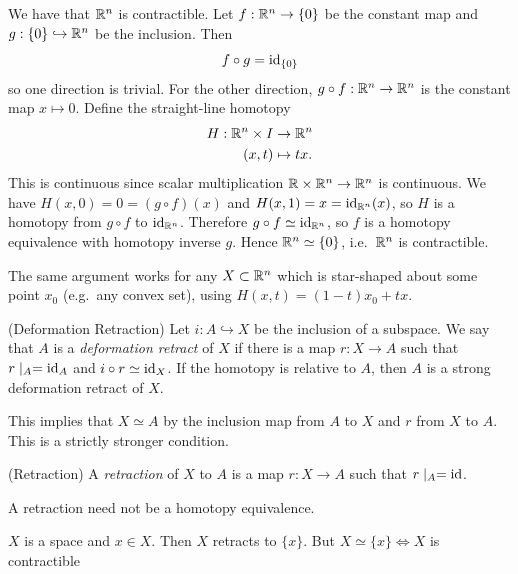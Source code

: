 \documentclass{article}
\begin{document}
\begin{example}
  We have that $ \mathbb{R}^n $ is contractible. Let $ f:\mathbb{R}^n\to\{0\} $ be the constant map and $ g:\{0\}\hookrightarrow\mathbb{R}^n $ be the inclusion. Then
  \[
	  f\circ g = \mathrm{id}_{\{0\}}
  \]
  so one direction is trivial. For the other direction, $ g\circ f:\mathbb{R}^n\to\mathbb{R}^n $ is the constant map $ x\mapsto 0 $. Define the straight-line homotopy
  \begin{align*}
	  H : \mathbb{R}^n \times I &\to \mathbb{R}^n\\
	  (x,t) &\mapsto tx.
  \end{align*}
  This is continuous since scalar multiplication $ \mathbb{R}\times\mathbb{R}^n\to\mathbb{R}^n $ is continuous. We have $ H(x,0) = 0 = (g\circ f)(x) $ and $ H(x,1) = x = \mathrm{id}_{\mathbb{R}^n}(x) $, so $ H $ is a homotopy from $ g\circ f $ to $ \mathrm{id}_{\mathbb{R}^n} $. Therefore $ g\circ f\simeq\mathrm{id}_{\mathbb{R}^n} $, so $ f $ is a homotopy equivalence with homotopy inverse $ g $. Hence $ \mathbb{R}^n\simeq\{0\} $, i.e.\ $ \mathbb{R}^n $ is contractible.
  \par
  The same argument works for any $ X\subset\mathbb{R}^n $ which is star-shaped about some point $ x_0 $ (e.g.\ any convex set), using $ H(x,t) = (1-t)x_0 + tx $.
\end{example}
\begin{definition}
(Deformation Retraction) Let $ i:A\hookrightarrow X $ be the inclusion of a subspace. We say that $ A $ is a \textit{deformation retract} of $ X $ if there is a map $ r:X\to A $ such that $ r\mid_A=\mathrm{id}_A $ and $ i\circ r\simeq\mathrm{id}_X $. If the homotopy is relative to $ A $, then $ A $ is a strong deformation retract of $ X $.
\end{definition}
\begin{remark}
  This implies that $ X\simeq A $ by the inclusion map from $ A $ to $ X $ and $ r $ from $ X $ to $ A $. This is a strictly stronger condition.
\end{remark}
\begin{definition}
	(Retraction) A \textit{retraction} of $ X $ to $ A $ is a map $ r:X\to A $ such that $ r\mid_A = \mathrm{id} $.
\end{definition}
\begin{remark}
  A retraction need not be a homotopy equivalence.
\end{remark}
\begin{example}
	$ X $ is a space and $ x\in X $. Then $ X $ retracts to $ \{x\} $. But $ X\simeq \{x\} \iff X $ is contractible
\end{example} 
\end{document}
